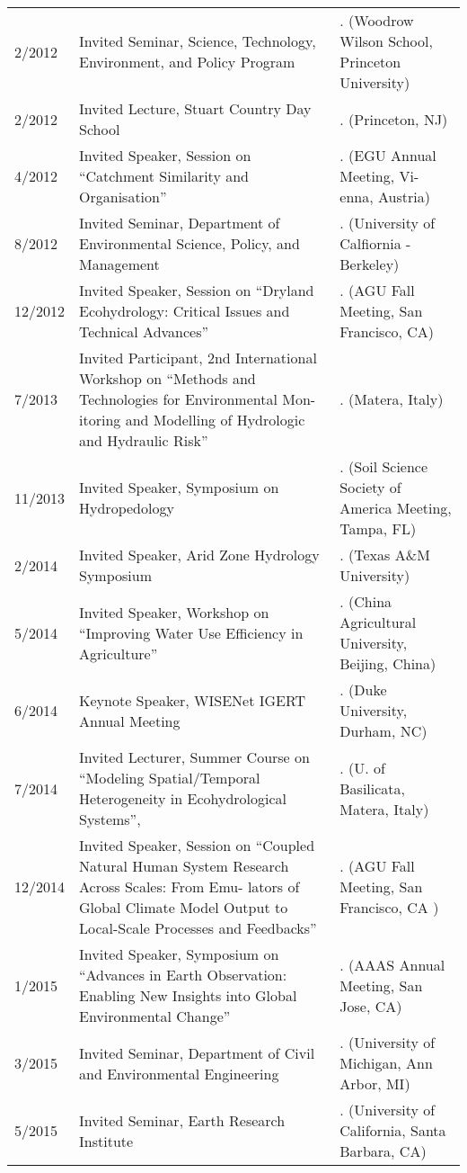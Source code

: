 \begin{longtable}{lp{7.0cm}p{6.5cm}}
2/2012 & Invited Seminar, Science, Technology, Environment, and Policy Program & . (Woodrow Wilson School, Princeton University) \\
2/2012 & Invited Lecture, Stuart Country Day School & . (Princeton, NJ) \\
4/2012 & Invited Speaker, Session on ``Catchment Similarity and Organisation'' & . (EGU Annual Meeting, Vi- enna, Austria) \\
8/2012 & Invited Seminar, Department of Environmental Science, Policy, and Management & . (University of Calfiornia - Berkeley) \\
12/2012 & Invited Speaker, Session on ``Dryland Ecohydrology: Critical Issues and Technical Advances'' & . (AGU Fall Meeting, San Francisco, CA) \\
7/2013 & Invited Participant, 2nd International Workshop on ``Methods and Technologies for Environmental Mon- itoring and Modelling of Hydrologic and Hydraulic Risk'' & . (Matera, Italy) \\
11/2013 & Invited Speaker, Symposium on Hydropedology & . (Soil Science Society of America Meeting, Tampa, FL) \\
2/2014 & Invited Speaker, Arid Zone Hydrology Symposium & . (Texas A\&M University) \\
5/2014 & Invited Speaker, Workshop on ``Improving Water Use Efficiency in Agriculture'' & . (China Agricultural University, Beijing, China) \\
6/2014 & Keynote Speaker, WISENet IGERT Annual Meeting & . (Duke University, Durham, NC) \\
7/2014 & Invited Lecturer, Summer Course on ``Modeling Spatial/Temporal Heterogeneity in Ecohydrological Systems'', & . (U. of Basilicata, Matera, Italy) \\
12/2014 & Invited Speaker, Session on ``Coupled Natural Human System Research Across Scales: From Emu- lators of Global Climate Model Output to Local-Scale Processes and Feedbacks'' & . (AGU Fall Meeting, San Francisco, CA ) \\
1/2015 & Invited Speaker, Symposium on ``Advances in Earth Observation: Enabling New Insights into Global Environmental Change'' & . (AAAS Annual Meeting, San Jose, CA) \\
3/2015 & Invited Seminar, Department of Civil and Environmental Engineering & . (University of Michigan, Ann Arbor, MI) \\
5/2015 & Invited Seminar, Earth Research Institute & . (University of California, Santa Barbara, CA) \\

\end{longtable}
